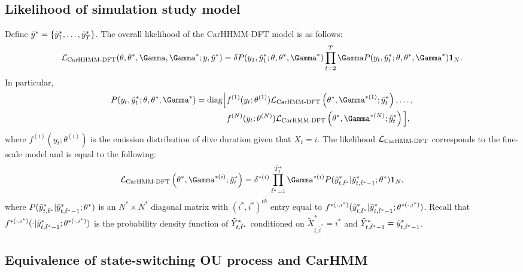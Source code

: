 
\subsection{Likelihood of simulation study model}

Define $\tilde{y}^* = \{\tilde{y}^*_1,\ldots,\tilde{y}^*_{T}\}$. The overall likelihood of the CarHHMM-DFT model is as follows:
%
$$\calL_{\text{CarHHMM-DFT}}(\theta,\theta^*,\Gamma,\Gamma^*;y,\z) = \delta P(y_1,\z_1;\theta,\theta^*,\Gamma^*) \prod_{t=2}^T \Gamma P(y_t,\z_t;\theta,\theta^*,\Gamma^*) \mathbf{1}_N.$$
%
In particular,
%
\begin{align*}
P(y_t,\z_t;\theta,\theta^*,\Gamma^*)  = \text{diag}\Big[&f^{(1)}(y_t;\theta^{(1)})\calL_{\text{CarHMM-DFT}}\left(\theta^*,\Gamma^{*(1)};\z_t\right), \ldots , \\
&f^{(N)}(y_t;\theta^{(N)})\calL_{\text{CarHMM-DFT}}\left(\theta^*,\Gamma^{*(N)};\z_t\right) \Big],
\end{align*}
%
where $f^{(i)}(y_t;\theta^{(i)})$ is the emission distribution of dive duration given that $X_t = i$. The likelihood $\mathcal{L}_{\text{CarHMM-DFT}}$ corresponds to the fine-scale model and is equal to the following:
%
$$\calL_{\text{CarHMM-DFT}}\left(\theta^{*},\Gamma^{*(i)};\z_t\right) = \delta^{*(i)} \prod_{\tilde t^* = 1}^{\tilde T_t^*} \Gamma^{*(i)} P(\z_{t,\tilde t^*}|\z_{t,\tilde t^*-1};\theta^*) \mathbf{1}_N,$$
%
where $P(\tilde{y}^*_{t,\tilde t^*}|\tilde{y}^*_{t,\tilde t^*-1};\theta^*)$ is an $N^* \times N^*$ diagonal matrix with $(i^*,i^*)^{th}$ entry equal to $f^{*(\cdot,i^*)}(\tilde{y}^*_{t,\tilde t^*}|\tilde{y}^*_{t,\tilde t^*-1}; \theta^{*(\cdot,i^*)})$.
%
Recall that $f^{*(\cdot,i^*)}(\cdot|\tilde{y}^*_{t,\tilde t^*-1}; \theta^{*(\cdot,i^*)})$ is the probability density function of $\tilde{Y}^*_{t,\tilde t^*}$ conditioned on $\tilde X^*_{t,\tilde t^*} = i^*$ and $\tilde{Y}^*_{t,\tilde t^*-1} = \tilde{y}^*_{t,\tilde t^*-1}$.


\iffalse

\subsection{Equivalence of state-switching OU process and CarHMM}

